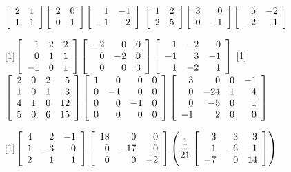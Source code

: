 
\begin{enumerate}[!HW!, start=1]
\begin{multicols}{2}
\itemspade $\mtx{rr}{2&1\\1&1}\mtx{rr}{2&0\\0&1}\mtx{rr}{1&-1\\-1&2}$ %
\itemspade $\mtx{rr}{1&2\\2&5}\mtx{rr}{3&0\\0&-1}\mtx{rr}{5&-2\\-2&1}$ %
\end{multicols}
\begin{multicols}{2}
\itemspade \scalebox{0.9}[1]{$\mtx{rrr}{1&2&2\\0&1&1\\-1&0&1}\mtx{rrr}{-2&0&0\\0&-2&0\\0&0&3}\mtx{rrr}{1&-2&0\\-1&3&-1\\1&-2&1}$} %
\itemspade \scalebox{0.75}[1]{$\mtx{rrrr}{2&0&2&5\\1&0&1&3\\4&1&0&12\\5&0&6&15}\mtx{rrrr}{1&0&0&0\\0&-1&0&0\\0&0&-1&0\\0&0&0&0}\mtx{rrrr}{3&0&0&-1\\0&-24&1&4\\0&-5&0&1\\-1&2&0&0}$} 
\end{multicols}
\begin{multicols}{2}
\item \scalebox{0.8}[1]{$\mtx{rrr}{4&2&-1\\1&-3&0\\2&1&1}\mtx{rrr}{18&0&0\\0&-17&0\\0&0&-2}\left(\dfrac{1}{21}\mtx{rrr}{3&3&3\\1&-6&1\\-7&0&14}\right)$} %
\end{multicols}
\end{enumerate}
